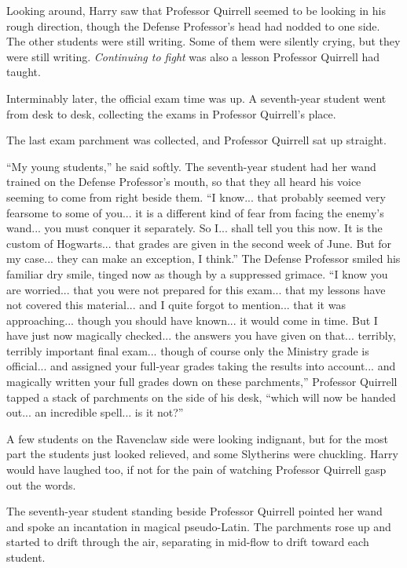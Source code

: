 Looking around, Harry saw that Professor Quirrell seemed to be looking in his rough direction, though the Defense Professor's head had nodded to one side. The other students were still writing. Some of them were silently crying, but they were still writing. \emph{Continuing to fight} was also a lesson Professor Quirrell had taught.

Interminably later, the official exam time was up. A seventh-year student went from desk to desk, collecting the exams in Professor Quirrell's place.

The last exam parchment was collected, and Professor Quirrell sat up straight.

``My young students,'' he said softly. The seventh-year student had her wand trained on the Defense Professor's mouth, so that they all heard his voice seeming to come from right beside them. ``I know... that probably seemed very fearsome to some of you... it is a different kind of fear from facing the enemy's wand... you must conquer it separately. So I... shall tell you this now. It is the custom of Hogwarts... that grades are given in the second week of June. But for my case... they can make an exception, I think.'' The Defense Professor smiled his familiar dry smile, tinged now as though by a suppressed grimace. ``I know you are worried... that you were not prepared for this exam... that my lessons have not covered this material... and I quite forgot to mention... that it was approaching... though you should have known... it would come in time. But I have just now magically checked... the answers you have given on that... terribly, terribly important final exam... though of course only the Ministry grade is official... and assigned your full-year grades taking the results into account... and magically written your full grades down on these parchments,'' Professor Quirrell tapped a stack of parchments on the side of his desk, ``which will now be handed out... an incredible spell... is it not?''

A few students on the Ravenclaw side were looking indignant, but for the most part the students just looked relieved, and some Slytherins were chuckling. Harry would have laughed too, if not for the pain of watching Professor Quirrell gasp out the words.

The seventh-year student standing beside Professor Quirrell pointed her wand and spoke an incantation in magical pseudo-Latin. The parchments rose up and started to drift through the air, separating in mid-flow to drift toward each student.

